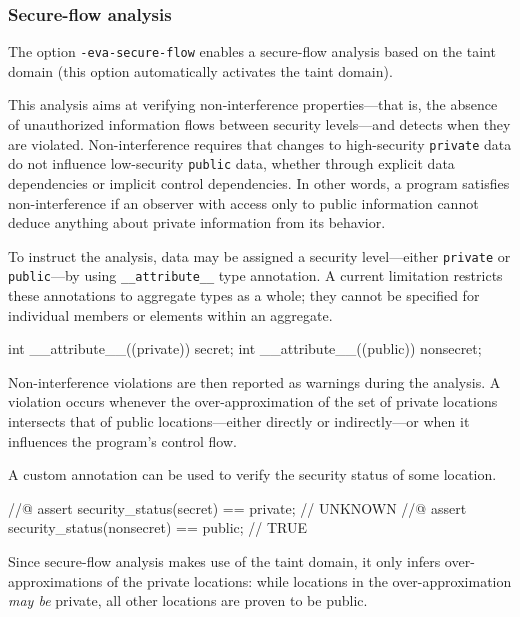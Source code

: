 \documentclass{frama-c-book}
\begin{document}
\subsubsection{Secure-flow analysis}
The option \texttt{-eva-secure-flow} enables a secure-flow analysis based on the
taint domain (this option automatically activates the taint domain).

This analysis aims at verifying non-interference properties---that is, the
absence of unauthorized information flows between security levels---and detects
when they are violated. Non-interference requires that changes to high-security
\texttt{private} data do not influence low-security \texttt{public} data,
whether through explicit data dependencies or implicit control dependencies. In
other words, a program satisfies non-interference if an observer with access
only to public information cannot deduce anything about private information from
its behavior.

To instruct the analysis, data may be assigned a security level---either
\lstinline|private| or \lstinline|public|---by using \lstinline|__attribute__|
type annotation. A current limitation restricts these annotations to aggregate
types as a whole; they cannot be specified for individual members or elements
within an aggregate.

\begin{listing-nonumber}
  int __attribute__((private)) secret;
  int __attribute__((public))  nonsecret;
\end{listing-nonumber}

Non-interference violations are then reported as warnings during the \Eva{}
analysis. A violation occurs whenever the over-approximation of the set of
private locations intersects that of public locations---either directly or
indirectly---or when it influences the program's control flow.

A custom \acsl{} annotation can be used to verify the security status of some
location.

\begin{listing-nonumber}
  //@ assert security_status(secret) == private;    // UNKNOWN
  //@ assert security_status(nonsecret) == public;  // TRUE
\end{listing-nonumber}

Since secure-flow analysis makes use of the taint domain, it only infers
over-approximations of the private locations: while locations in the
over-approximation \emph{may be} private, all other locations are proven to be
public.
\end{document}
